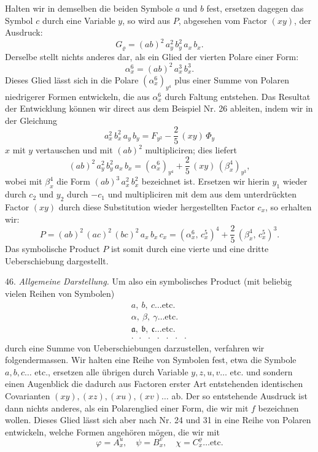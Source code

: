 \documentclass[11pt]{article}
\providecommand{\weberpage}[1]{}
\let\Phi\varPhi
\begin{document}
\weberpage{49}
Halten wir in demselben die beiden Symbole $a$ und $b$ fest, ersetzen dagegen das Symbol $c$ durch eine Variable $y$, so wird aus $P$, abgesehen vom Factor $(xy)$, der Ausdruck:
\[
G_\varrho = (ab)^2\,a_y^2\,b_y^2\,a_x\,b_x.
\]
Derselbe stellt nichts anderes dar, als ein Glied der vierten Polare einer Form:
\[
\alpha_x^6 = (ab)^2\,a_x^3\,b_x^3.
\]
Dieses Glied lässt sich in die Polare $(\alpha_x^6)_{y^4}$ plus einer Summe von Polaren niedrigerer Formen entwickeln, die aus $\alpha_x^6$ durch Faltung entstehen. Das Resultat der Entwicklung können wir direct aus dem Beispiel Nr. 26 ableiten, indem wir in der Gleichung
\[
a_x^2\,b_x^2\,a_y\,b_y = F_{y^2} - \frac{2}{5}\,(xy)\,\Phi_y
\]
$x$ mit $y$ vertauschen und mit $(ab)^2$ multipliciren; dies liefert
\[
(ab)^2\,a_y^2\,b_y^2\,a_x\,b_x = (\alpha_x^6)_{y^4} + \frac{2}{5}\,(xy)\,(\beta_x^4)_{y^3},
\]
wobei mit $\beta_x^4$ die Form $(ab)^3\,a_x^2\,b_x^2$ bezeichnet ist. Ersetzen wir hierin $y_1$ wieder durch $c_2$ und $y_2$ durch $-c_1$ und multipliciren mit dem aus dem unterdrückten Factor $(xy)$ durch diese Substitution wieder hergestellten Factor $c_x$, so erhalten wir:
\[
P = (ab)^2\,(ac)^2\,(bc)^2\,a_x\,b_x\,c_x = (\alpha_x^6,\, c_x^5)^4 + \frac{2}{5}\,(\beta_x^4,\, c_x^5)^3.
\]
Das symbolische Product $P$ ist somit durch eine vierte und eine dritte Ueberschiebung dargestellt.

46. \textit{Allgemeine Darstellung.} Um also ein symbolisches Product (mit beliebig vielen Reihen von Symbolen)
\[
\begin{array}{c}
a,\ b,\ c \dots \text{etc.} \\
\alpha,\ \beta,\ \gamma \dots \text{etc.} \\
\mathfrak{a},\ \mathfrak{b},\ \mathfrak{c} \dots \text{etc.} \\
\cdot\ \ \cdot\ \ \cdot\ \ \cdot\ \ \cdot\ \ \cdot\ \ \cdot
\end{array}
\]
durch eine Summe von Ueberschiebungen darzustellen, verfahren wir folgendermassen. Wir halten eine Reihe von Symbolen fest, etwa die Symbole $a, b, c \dots$ etc., ersetzen alle übrigen durch Variable $y, z, u, v \dots$ etc. und sondern einen Augenblick die dadurch aus Factoren erster Art entstehenden identischen Covarianten $(xy), (xz), (xu), (xv) \dots$ ab. Der so entstehende Ausdruck ist dann nichts anderes, als ein Polarenglied einer Form, die wir mit $f$ bezeichnen wollen. Dieses Glied lässt sich aber nach Nr. 24 und 31 in eine Reihe von Polaren entwickeln, welche Formen angehören mögen, die wir mit
\[
\varphi = A_x^u, \quad \psi = B_x^v, \quad \chi = C_x^\varrho \dots \text{etc.}
\]
\end{document}
